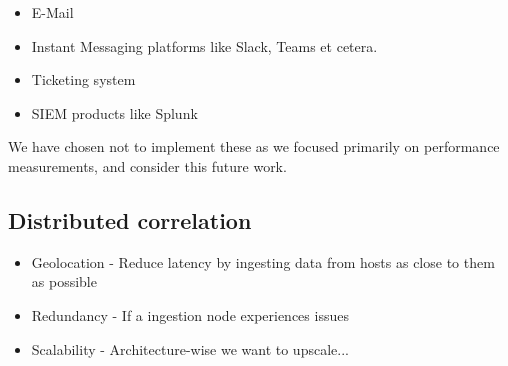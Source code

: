 \begin{itemize}
    \item E-Mail
    \item Instant Messaging platforms like Slack, Teams et cetera.
    \item Ticketing system
    \item SIEM products like Splunk
\end{itemize}
We have chosen not to implement these as we focused primarily on performance measurements, and consider this future work.

\subsection{Distributed correlation}
\label{sub:distributed-correlation}

\begin{itemize}
    \item Geolocation - Reduce latency by ingesting data from hosts as close to them as possible
    \item Redundancy - If a ingestion node experiences issues
    \item Scalability - Architecture-wise we want to upscale...
\end{itemize}

